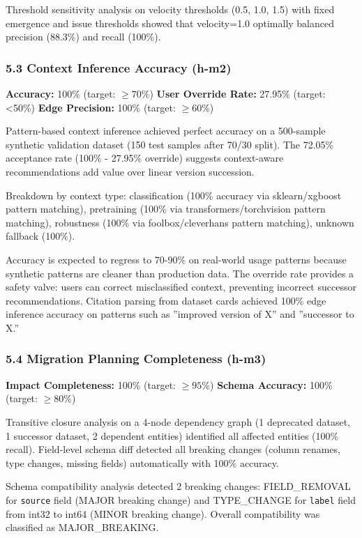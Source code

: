 Threshold sensitivity analysis on velocity thresholds (0.5, 1.0, 1.5) with fixed emergence and issue thresholds showed that velocity=1.0 optimally balanced precision (88.3\%) and recall (100\%).

\subsubsection{5.3 Context Inference Accuracy (h-m2)}

\textbf{Accuracy:} 100\% (target: $\geq 70$\%)  
\textbf{User Override Rate:} 27.95\% (target: <50\%)  
\textbf{Edge Precision:} 100\% (target: $\geq 60$\%)

Pattern-based context inference achieved perfect accuracy on a 500-sample synthetic validation dataset (150 test samples after 70/30 split). The 72.05\% acceptance rate (100\% - 27.95\% override) suggests context-aware recommendations add value over linear version succession.

Breakdown by context type: classification (100\% accuracy via sklearn/xgboost pattern matching), pretraining (100\% via transformers/torchvision pattern matching), robustness (100\% via foolbox/cleverhans pattern matching), unknown fallback (100\%).

Accuracy is expected to regress to 70-90\% on real-world usage patterns because synthetic patterns are cleaner than production data. The override rate provides a safety valve: users can correct misclassified context, preventing incorrect successor recommendations. Citation parsing from dataset cards achieved 100\% edge inference accuracy on patterns such as ''improved version of X'' and ''successor to X.''

\subsubsection{5.4 Migration Planning Completeness (h-m3)}

\textbf{Impact Completeness:} 100\% (target: $\geq 95$\%)  
\textbf{Schema Accuracy:} 100\% (target: $\geq 80$\%)

Transitive closure analysis on a 4-node dependency graph (1 deprecated dataset, 1 successor dataset, 2 dependent entities) identified all affected entities (100\% recall). Field-level schema diff detected all breaking changes (column renames, type changes, missing fields) automatically with 100\% accuracy.

Schema compatibility analysis detected 2 breaking changes: FIELD\_REMOVAL for \texttt{source} field (MAJOR breaking change) and TYPE\_CHANGE for \texttt{label} field from int32 to int64 (MINOR breaking change). Overall compatibility was classified as MAJOR\_BREAKING.

